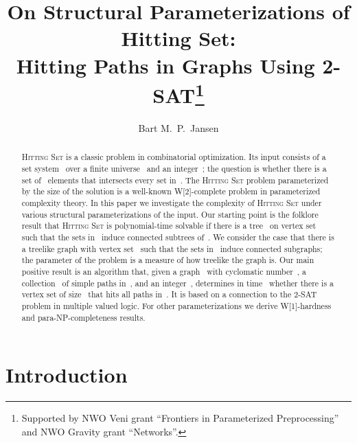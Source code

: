 \let\accentvec\vec  \documentclass{llncs}
\title{On Structural Parameterizations of Hitting Set: \\ Hitting Paths in Graphs Using 2-SAT\thanks{Supported by NWO Veni grant ``Frontiers in Parameterized Preprocessing'' and NWO Gravity grant ``Networks''.}}
\author{Bart M.\ P.\ Jansen \inst{1}}
\institute{Eindhoven University of Technology, The Netherlands. \email{b.m.p.jansen@tue.nl}}
\newcommand{\HittingSet}{\textsc{Hitting Set}\xspace}
\begin{document}
\hypersetup{bookmarksdepth=-1}

\maketitle

\hypersetup{bookmarksdepth=2} 

\begin{abstract}
\HittingSet is a classic problem in combinatorial optimization. Its input consists of a set system~ over a finite universe~ and an integer~; the question is whether there is a set of~ elements that intersects every set in~. The \HittingSet problem parameterized by the size of the solution is a well-known W[2]-complete problem in parameterized complexity theory. In this paper we investigate the complexity of \HittingSet under various structural parameterizations of the input. Our starting point is the folklore result that \HittingSet is polynomial-time solvable if there is a tree~ on vertex set~ such that the sets in~ induce connected subtrees of~. We consider the case that there is a treelike graph with vertex set~ such that the sets in~ induce connected subgraphs; the parameter of the problem is a measure of how treelike the graph is. Our main positive result is an algorithm that, given a graph~ with cyclomatic number~, a collection~ of simple paths in~, and an integer~, determines in time~ whether there is a vertex set of size~ that hits all paths in~. It is based on a connection to the 2-SAT problem in multiple valued logic. For other parameterizations we derive W[1]-hardness and para-NP-completeness results.
\end{abstract}

\section{Introduction}
\end{document}
